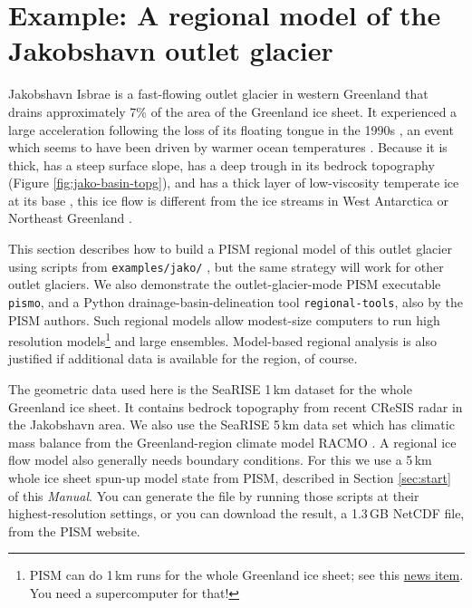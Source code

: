 
\section{Example: A regional model of the Jakobshavn outlet glacier}\label{sec:jako}  


Jakobshavn Isbrae is a fast-flowing outlet glacier in western Greenland that drains approximately 7\% of the area of the Greenland ice sheet.  It experienced a large acceleration following the loss of its floating tongue in the 1990s \cite{JoughinAbdalatiFahnestock}, an event which seems to have been driven by warmer ocean temperatures \cite{Hollandetal2008}.  Because it is thick, has a steep surface slope, has a deep trough in its bedrock topography (Figure \ref{fig:jako-basin-topg}), and has a thick layer of low-viscosity temperate ice at its base \cite{Luethietal2009}, this ice flow is different from the ice streams in West Antarctica or Northeast Greenland \cite{TrufferEchelmeyer}.
 
This section describes how to build a PISM regional model of this outlet glacier using scripts from \texttt{examples/jako/} \cite{DellaGiustina2011}, but the same strategy will work for other outlet glaciers.  We also demonstrate the outlet-glacier-mode PISM executable \texttt{pismo}, and a Python drainage-basin-delineation tool \texttt{regional-tools}, also by the PISM authors.  Such regional models allow modest-size computers to run high resolution models\footnote{PISM can do 1\,km runs for the whole Greenland ice sheet; see this \href{http://www.pism-docs.org/wiki/doku.php?id=news:first1km}{news item}.  You need a supercomputer for that!} and large ensembles.  Model-based regional analysis is also justified if additional data is available for the region, of course.

The geometric data used here is the SeaRISE  \cite{Bindshadler2012SeaRISE} 1\,km dataset for the whole Greenland ice sheet.  It contains bedrock topography from recent CReSIS radar in the Jakobshavn area.  We also use the SeaRISE 5\,km data set which has climatic mass balance from the Greenland-region climate model RACMO \cite{Ettemaetal2009}.  A regional ice flow model also generally needs boundary conditions.  For this we use a 5\,km whole ice sheet spun-up model state from PISM, described in Section \ref{sec:start} of this \emph{Manual}.  You can generate the file by running those scripts at their highest-resolution settings, or you can download the result, a 1.3\,GB NetCDF file, from the PISM website.

